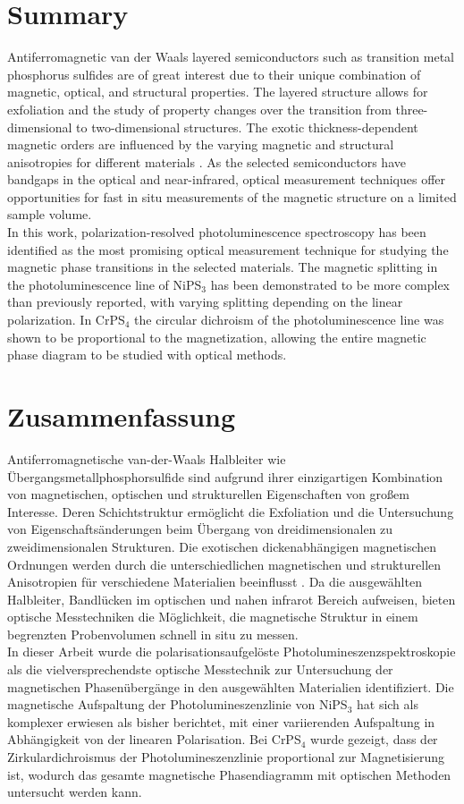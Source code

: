 \documentclass[
	twoside,
	parskip=half,
	a4paper,
]{scrbook}
\begin{document}
\section*{Summary}
Antiferromagnetic van der Waals layered semiconductors such as transition metal phosphorus sulfides are of great interest due to their unique combination of magnetic, optical, and structural properties. 
The layered structure allows for exfoliation and the study of property changes over the transition from three-dimensional to two-dimensional structures.
The exotic thickness-dependent magnetic orders \cite{AFM_review} are influenced by the varying magnetic and structural anisotropies for different materials \cite{MPS_magnetism, CrPS4_magnetic}.
As the selected semiconductors have bandgaps in the optical and near-infrared, optical measurement techniques offer opportunities for fast in situ measurements of the magnetic structure on a limited sample volume.\\
In this work, polarization-resolved photoluminescence spectroscopy has been identified as the most promising optical measurement technique for studying the magnetic phase transitions in the selected materials.
The magnetic splitting in the photoluminescence line of NiPS$_3$ has been demonstrated to be more complex than previously reported, with varying splitting depending on the linear polarization.
In CrPS$_4$ the circular dichroism of the photoluminescence line was shown to be proportional to the magnetization, allowing the entire magnetic phase diagram to be studied with optical methods.

\vfill
\section*{Zusammenfassung}
Antiferromagnetische van-der-Waals Halbleiter wie Übergangsmetallphosphorsulfide sind aufgrund ihrer einzigartigen Kombination von magnetischen, optischen und strukturellen Eigenschaften von großem Interesse. 
Deren Schichtstruktur ermöglicht die Exfoliation und die Untersuchung von Eigenschaftsänderungen beim Übergang von dreidimensionalen zu zweidimensionalen Strukturen.
Die exotischen dickenabhängigen magnetischen Ordnungen \cite{AFM_review} werden durch die unterschiedlichen magnetischen und strukturellen Anisotropien für verschiedene Materialien beeinflusst \cite{MPS_magnetism, CrPS4_magnetic}.
Da die ausgewählten Halbleiter, Bandlücken im optischen und nahen infrarot Bereich aufweisen, bieten optische Messtechniken die Möglichkeit, die magnetische Struktur in einem begrenzten Probenvolumen schnell in situ zu messen.\\
In dieser Arbeit wurde die polarisationsaufgelöste Photolumineszenzspektroskopie als die vielversprechendste optische Messtechnik zur Untersuchung der magnetischen Phasenübergänge in den ausgewählten Materialien identifiziert.
Die magnetische Aufspaltung der Photolumineszenzlinie von NiPS$_3$ hat sich als komplexer erwiesen als bisher berichtet, mit einer variierenden Aufspaltung in Abhängigkeit von der linearen Polarisation.
Bei CrPS$_4$ wurde gezeigt, dass der Zirkulardichroismus der Photolumineszenzlinie proportional zur Magnetisierung ist, wodurch das gesamte magnetische Phasendiagramm mit optischen Methoden untersucht werden kann.
\vfill
\end{document}
